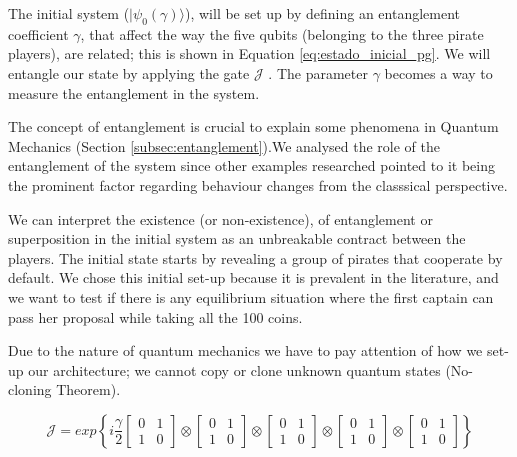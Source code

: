 The initial system ($\vert \psi_{0}(\gamma) \rangle$), will be set up by defining an entanglement coefficient $\gamma$, that affect the way the five qubits (belonging to the three pirate players), are related; this is shown in Equation \ref{eq:estado_inicial_pg}. 
We will entangle our state by applying the gate $\mathcal{J}$ \cite{Letters2002}. The parameter $\gamma$ becomes a way to measure the entanglement in the system\cite{Eisert2008}. 

The concept of entanglement is crucial to explain some phenomena in Quantum Mechanics (Section \ref{subsec:entanglement}).We analysed the role of the entanglement of the system since other examples researched pointed to it being the prominent factor regarding behaviour changes from the classsical perspective\cite{Fra2011a}\cite{Fra2011}\cite{Letters2002}\cite{Khan2011}\cite{Ricketts2006}. 

We can interpret the existence (or non-existence), of entanglement or superposition in the initial system as an unbreakable contract between the players\cite{Piotrowski}. The initial state starts by revealing a group of pirates that cooperate by default. We chose this initial set-up because it is prevalent in the literature\cite{Eisert2008}\cite{Fra2011a}\cite{Fra2011}\cite{Letters2002}, and we want to test if there is any equilibrium situation where the first captain can pass her proposal while taking all the 100 coins. 



Due to the nature of quantum mechanics we have to pay attention of how we set-up our architecture; we cannot copy or clone unknown quantum states (No-cloning Theorem)\cite{Rieffel2011}. 



\begin{equation}
\mathcal{J}=exp\left\{ i\frac{\gamma}{2}\left[\begin{array}{cc}
0 & 1\\
1 & 0
\end{array}\right]\otimes\left[\begin{array}{cc}
0 & 1\\
1 & 0
\end{array}\right]\otimes\left[\begin{array}{cc}
0 & 1\\
1 & 0
\end{array}\right]\otimes\left[\begin{array}{cc}
0 & 1\\
1 & 0
\end{array}\right]
\otimes\left[\begin{array}{cc}
0 & 1\\
1 & 0
\end{array}\right]
\right\}
\label{eq:matrix_exponencial_esoterica}
\end{equation} 


